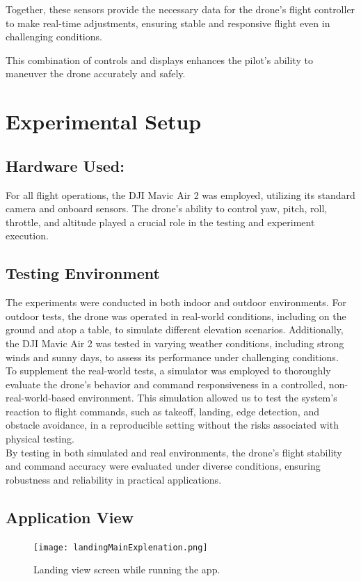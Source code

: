 \documentclass[unnumsec,webpdf,modern,large]{mam-authoring-template}%
\begin{document}
Together, these sensors provide the necessary data for the drone's flight controller to make real-time adjustments, ensuring stable and responsive flight even in challenging conditions.


This combination of controls and displays enhances the pilot's ability to maneuver the drone accurately and safely.


\section{Experimental Setup} \label{Experimental Setup}

\subsection{Hardware Used:}
For all flight operations, the DJI Mavic Air 2 was employed, utilizing its standard camera and onboard sensors. The drone's ability to control yaw, pitch, roll, throttle, and altitude played a crucial role in the testing and experiment execution.

\subsection{Testing Environment}

The experiments were conducted in both indoor and outdoor environments. For outdoor tests, the drone was operated in real-world conditions, including on the ground and atop a table, to simulate different elevation scenarios. Additionally, the DJI Mavic Air 2 was tested in varying weather conditions, including strong winds and sunny days, to assess its performance under challenging conditions.\\
To supplement the real-world tests, a simulator was employed to thoroughly evaluate the drone’s behavior and command responsiveness in a controlled, non-real-world-based environment. This simulation allowed us to test the system's reaction to flight commands, such as takeoff, landing, edge detection, and obstacle avoidance, in a reproducible setting without the risks associated with physical testing.\\
By testing in both simulated and real environments, the drone's flight stability and command accuracy were evaluated under diverse conditions, ensuring robustness and reliability in practical applications.
\subsection{Application View}
\begin{figure}[H]
    \centering
    \texttt{[image: landingMainExplenation.png]}  %
    \caption{Landing view screen while running the app.}
    \label{fig:landingMainExplenation.}
\end{figure}
\end{document}
